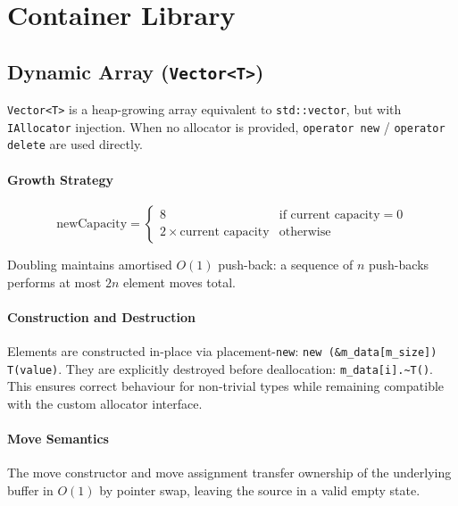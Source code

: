 \chapter{Container Library}

\section{Dynamic Array (\texttt{Vector<T>})}

\texttt{Vector<T>} is a heap-growing array equivalent to \texttt{std::vector},
but with \texttt{IAllocator} injection. When no allocator is provided,
\texttt{operator new} / \texttt{operator delete} are used directly.

\subsubsection{Growth Strategy}

\begin{equation}
\text{newCapacity} =
\begin{cases}
  8 & \text{if current capacity} = 0 \\
  2 \times \text{current capacity} & \text{otherwise}
\end{cases}
\end{equation}

Doubling maintains amortised $O(1)$ push-back: a sequence of $n$
push-backs performs at most $2n$ element moves total.

\subsubsection{Construction and Destruction}

Elements are constructed in-place via placement-\texttt{new}:
\texttt{new (\&m\_data[m\_size]) T(value)}.
They are explicitly destroyed before deallocation:
\texttt{m\_data[i].\textasciitilde T()}.
This ensures correct behaviour for non-trivial types while remaining
compatible with the custom allocator interface.

\subsubsection{Move Semantics}

The move constructor and move assignment transfer ownership of the
underlying buffer in $O(1)$ by pointer swap, leaving the source in
a valid empty state.

